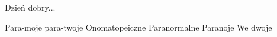\documentclass[../../../songbook.tex]{subfiles}
\begin{document}
\-\hspace{1cm} Dzień dobry...  \newline

\-\hspace{1cm} Para-moje  \newline
\-\hspace{1cm} para-twoje  \newline
\-\hspace{1cm} Onomatopeiczne  \newline
\-\hspace{1cm} Paranormalne  \newline
\-\hspace{1cm} Paranoje  \newline
\-\hspace{1cm} We dwoje  \newline
\end{document}
